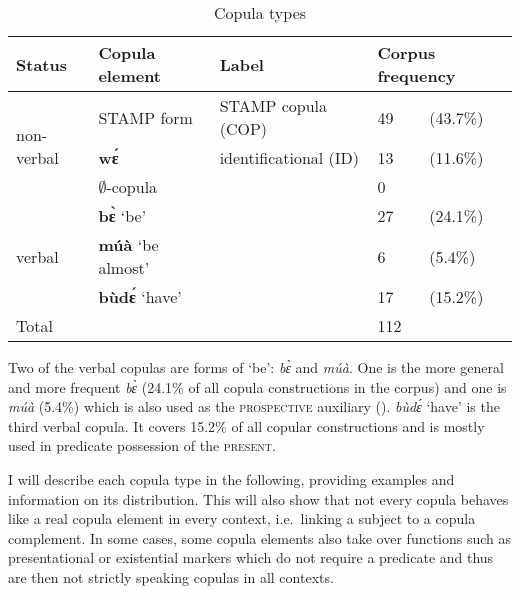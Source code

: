 \begin{table}[!h]
\centering
\begin{tabular}{l|llll}
 \midrule
Status                                &  Copula element & Label                      &  \multicolumn{2}{l}{Corpus frequency} \\
 \midrule
\multirow{3}{*}{non-verbal} & STAMP form        & STAMP copula (COP) & 49    & (43.7\%) \\
                                     & {\bfseries wɛ́}                    & identificational (ID) & 13   & (11.6\%)  \\
                                     & $\emptyset$-copula &                                &  0    &   \\  \midrule
\multirow{3}{*}{verbal} & {\bfseries bɛ̀} `be'               &                                 & 27   & (24.1\%) \\
                                   & {\bfseries múà} `be almost'             &                                 &   6    & (5.4\%) \\
				& {\bfseries bùdɛ́} `have'        &                                 &  17   & (15.2\%)   \\ 
 \midrule
Total                           &                                   &                                 &   112        & \\
 \midrule
\end{tabular}
\caption{Copula types}
\label{Tab:COP}
\end{table}

Two of the verbal copulas are forms of `be': {\itshape bɛ̀} and {\itshape múà}. One is the more general and more frequent {\itshape bɛ̀} (24.1\% of all copula constructions in the corpus) and one is {\itshape múà} (5.4\%) which is also used as the \textsc{prospective} auxiliary (). {\itshape bùdɛ́} `have' is the third verbal copula. It covers 15.2\% of all copular constructions and is mostly used in predicate possession of the \textsc{present}.

I will describe each copula type in the following, providing examples and information on its distribution. This will also show that not every copula behaves like a real copula element in every context, i.e.\ linking a subject to a copula complement. In some cases, some copula elements also take over functions such as presentational or existential markers which do not require a predicate and thus are then not strictly speaking copulas in all contexts.


